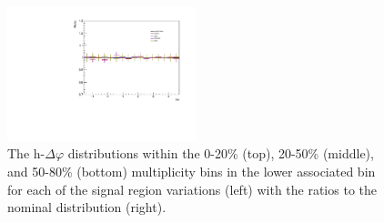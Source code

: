 \begin{figure}[ht]
    \includegraphics[width=0.49\textwidth]{figures/analysis/signal_variations_dphi_50_80_lowpt_ratio.pdf}
    \caption{The h-\lmb $\Delta\varphi$ distributions within the 0-20\% (top), 20-50\% (middle), and 50-80\% (bottom) multiplicity bins in the lower associated \pt bin for each of the signal region variations (left) with the ratios to the nominal distribution (right).}
    \label{fig:signal_region_variations_lowpt}
\end{figure}


